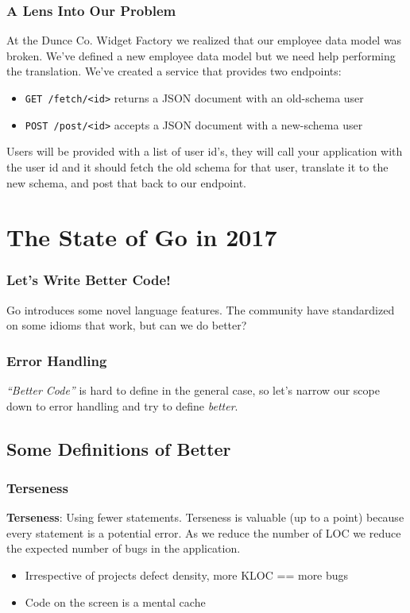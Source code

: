 \documentclass{beamer}
\begin{document}
\begin{frame}[fragile]
  \frametitle{A Lens Into Our Problem}
  At the Dunce Co. Widget Factory we realized that our employee data
  model was broken.  We've defined a new employee data model but we
  need help performing the translation. We've created a service that
  provides two endpoints:\\
  \vfill
  \begin{itemize}
  \item {\tt GET /fetch/<id>} returns a JSON document with an old-schema user
  \item {\tt POST /post/<id>} accepts a JSON document with a new-schema user
  \end{itemize}
  \vfill
  Users will be provided with a list of user id's, they will call your
  application with the user id and it should fetch the old schema for
  that user, translate it to the new schema, and post that back to our
  endpoint.
\end{frame}

\section{The State of Go in 2017}

\begin{frame}
  \frametitle{Let's Write Better Code!}
  Go introduces some novel language features.  The community have
  standardized on some idioms that work, but can we do better?
\end{frame}

\begin{frame}
  \frametitle{Error Handling}
  {\it ``Better Code''} is hard to define in the general case, so let's
  narrow our scope down to error handling and try to define
  {\it better}.
\end{frame}

\subsection{Some Definitions of Better}
\begin{frame}
  \frametitle{Terseness}
  {\bf Terseness}: Using fewer statements.
  \vfill
  Terseness is valuable (up to a point) because every statement is a
  potential error.  As we reduce the number of LOC we reduce the
  expected number of bugs in the application.
  \vfill
  \begin{itemize}
  \item Irrespective of projects defect density, more KLOC == more bugs
  \item Code on the screen is a mental cache
  \end{itemize}
\end{frame}
\end{document}
